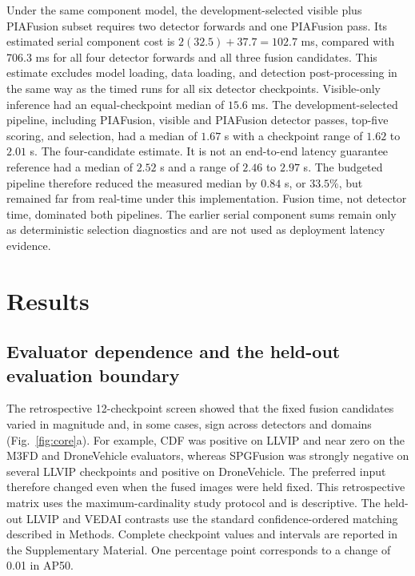 \documentclass[preprint,11pt]{elsarticle}
\providecommand{\DIFaddtex}[1]{{\protect\color{blue} \sf #1}} %
\providecommand{\DIFdeltex}[1]{{\protect\color{red} \scriptsize #1}} %
\providecommand{\DIFaddbegin}{} %
\providecommand{\DIFaddend}{} %
\providecommand{\DIFdelbegin}{} %
\providecommand{\DIFdelend}{} %
\providecommand{\DIFadd}[1]{\texorpdfstring{\DIFaddtex{#1}}{#1}} %
\providecommand{\DIFdel}[1]{\texorpdfstring{\DIFdeltex{#1}}{}} %
\begin{document}
\DIFdel{Under the same component model, the development-selected visible plus
PIAFusion subset requires two detector forwards and one PIAFusion pass. Its
estimated serial component cost is \(2(32.5)+37.7=102.7\) ms, compared with
706.3 ms for all four detector forwards and all three fusion candidates.
This estimate excludes model loading, data loading, and detection
post-processing in the same way as the }\DIFdelend \DIFaddbegin \DIFadd{12 timed runs for all six detector checkpoints.
Visible-only inference had an equal-checkpoint median of \(15.6\) ms. The
development-selected pipeline, including PIAFusion, visible and PIAFusion
detector passes, top-five scoring, and selection, had a median of \(1.67\) s
with a checkpoint range of \(1.62\) to \(2.01\) s. The }\DIFaddend four-candidate
\DIFdelbegin \DIFdel{estimate. It is not an
end-to-end latency guarantee}\DIFdelend \DIFaddbegin \DIFadd{reference had a median of \(2.52\) s and a range of \(2.46\) to \(2.97\) s.
The budgeted pipeline therefore reduced the measured median by \(0.84\) s, or
\(33.5\%\), but remained far from real-time under this implementation.
Fusion time, not detector time, dominated both pipelines. The earlier
serial component sums remain only as deterministic selection diagnostics and
are not used as deployment latency evidence}\DIFaddend .


\section{Results}

\subsection{Evaluator dependence and the held-out evaluation boundary}

The retrospective 12-checkpoint screen showed that the fixed fusion candidates
varied in magnitude and, in some cases, sign across detectors and domains
(Fig.~\ref{fig:core}a). For example, CDF was positive on LLVIP and near zero on
the M3FD and DroneVehicle evaluators, whereas SPGFusion was strongly negative
on several LLVIP checkpoints and positive on DroneVehicle. The preferred input
therefore changed even when the fused images were held fixed. This retrospective
matrix uses the maximum-cardinality study protocol and is descriptive. The
held-out LLVIP and VEDAI contrasts use the standard confidence-ordered matching
described in Methods. Complete checkpoint values and intervals are reported in the
Supplementary Material.
One percentage point corresponds to a change of 0.01 in AP50.
\end{document}
